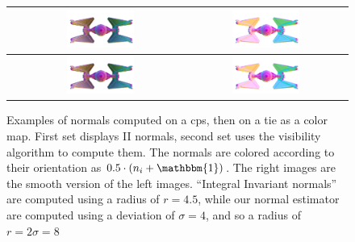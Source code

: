 \begin{figure}
\begin{tabular}{|c||c|c|}
        \hline
        \raisebox{18mm}{II} &
        \includegraphics[width=0.43\textwidth]{pictures/tie256-IIN-flat-edge-small} &
        \includegraphics[width=0.43\textwidth]{pictures/tie256-IIN-flat-small} \\
        \hline
        \raisebox{18mm}{Ours} &
        \includegraphics[width=0.43\textwidth]{pictures/tie256-VN-flat-edge-small} &
        \includegraphics[width=0.43\textwidth]{pictures/tie256-VN-flat-small} \\
        \hline
    \end{tabular}
    \caption{Examples of normals computed on a cps, then on a
    tie as a color map. First set displays II normals, second set
    uses the visibility algorithm to compute them. The normals are colored
    according to their orientation as $0.5 \cdot (n_i + \mathbbm{1})$. The
    right images are the smooth version of the left images. ``Integral
    Invariant normals'' are computed using a radius of $r=4.5$, while
    our normal estimator are computed using a deviation of $\sigma=4$, and so
    a radius of $r=2\sigma=8$}
    \label{fig:normals-estimation}
\end{figure}

